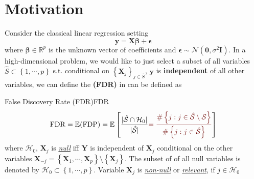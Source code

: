 \documentclass[twoside]{article}
\begin{document}

\section{Motivation}
Consider the classical linear regression setting
$$
\mathbf{y} = \mathbf{X}\boldsymbol{\beta} + \boldsymbol{\epsilon}
$$
where $\boldsymbol{\beta}\in\mathbb{R}^p$ is the unknown vector of coefficients and $\boldsymbol{\epsilon}\sim \mathcal{N}(\mathbf{0},\sigma^2\mathbf{I})$. In a high-dimensional problem, we would like to just select a subset of all variables $\hat{S}\subset \left\{ 1,\cdots,p \right\}$ s.t. conditional on $\left\{\mathbf{X}_j\right\}_{j\in\hat{S}}$, $\mathbf{y}$ is \textbf{independent} of all other variables, we can define the  \textbf{(FDR)} in can be defined as 
\begin{definition}{False Discovery Rate (FDR)}{FDR}
    \begin{align*}
        \mathrm{FDR} = \mathbb{E}(\mathrm{FDP}) = \mathbb{E}\left[ \frac{\lvert \hat{\mathcal{S}}\cap \mathcal{H}_0 \rvert}{ \lvert \hat{\mathcal{S}} \rvert } \textcolor{myred}{ =\frac{\#\left\{ j:j\in\hat{\mathcal{S}}\setminus \mathcal{S}\right\} }{\#\left\{ j:j\in\hat{\mathcal{S}}\right\} }} \right]
    \end{align*}
    where $\mathcal{H}_0$, $\mathbf{X}_j$ is \textit{\underline{null}} iff $\mathbf{Y}$ is independent of $\mathbf{X}_j$ conditional on the other variables $\mathbf{X}_{-j}=\left\{\mathbf{X}_1,\cdots,\mathbf{X}_p\right\}\setminus \left\{\mathbf{X}_j\right\}$. The subset of of all null variables is denoted by $\mathcal{H}_0\subset \left\{1,\cdots,p\right\}$. Variable $\mathbf{X}_j$ is \textit{\underline{non-null}} or \textit{\underline{relevant}}, if $j\in \mathcal{H}_0$
\end{definition}

\citet{candes2018panning}


\newpage


\end{document}

